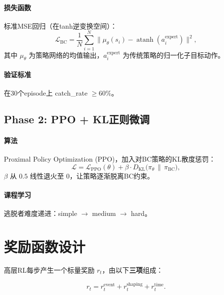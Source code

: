 \documentclass[11pt]{article}
\begin{document}
\paragraph{损失函数} 标准MSE回归（在tanh逆变换空间）：
\begin{equation}
  \mathcal{L}_{\text{BC}} = \frac{1}{N}\sum_{i=1}^{N}
  \big\| \mu_\theta(s_i) - \operatorname{atanh}(a_i^{\text{expert}}) \big\|^2,
\end{equation}
其中 $\mu_\theta$ 为策略网络的均值输出，$a_i^{\text{expert}}$ 为传统策略的归一化子目标动作。

\paragraph{验证标准} 在30个episode上 catch\_rate $\ge 60\%$。

\subsection{Phase 2: PPO + KL正则微调}

\paragraph{算法} Proximal Policy Optimization (PPO)，加入对BC策略的KL散度惩罚：
\begin{equation}
  \mathcal{L} = \mathcal{L}_{\text{PPO}}(\theta)
  + \beta \cdot D_{\text{KL}}\big(\pi_\theta \,\|\, \pi_{\text{BC}}\big),
\end{equation}
$\beta$ 从 $0.5$ 线性退火至 $0$，让策略逐渐脱离BC约束。

\paragraph{课程学习} 逃脱者难度递进：simple $\to$ medium $\to$ hard。


\section{奖励函数设计}

高层RL每步产生一个标量奖励 $r_t$，由以下\textbf{三项}组成：

\begin{equation}
  r_t = r_t^{\text{event}} + r_t^{\text{shaping}} + r_t^{\text{time}}.
\end{equation}
\end{document}

